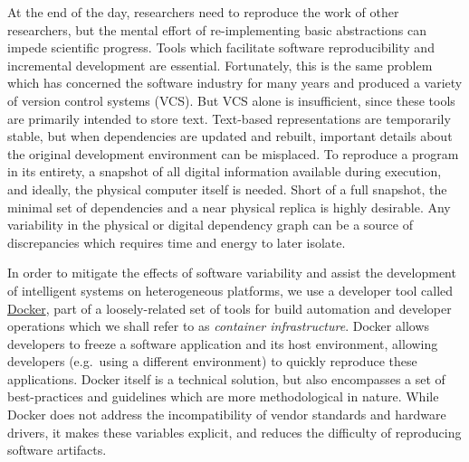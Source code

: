 At the end of the day, researchers need to reproduce the work of other researchers, but the mental effort of re-implementing basic abstractions can impede scientific progress. Tools which facilitate software reproducibility and incremental development are essential. Fortunately, this is the same problem which has concerned the software industry for many years and produced a variety of version control systems (VCS). But VCS alone is insufficient, since these tools are primarily intended to store text. Text-based representations are temporarily stable, but when dependencies are updated and rebuilt, important details about the original development environment can be misplaced. To reproduce a program in its entirety, a snapshot of all digital information available during execution, and ideally, the physical computer itself is needed. Short of a full snapshot, the minimal set of dependencies and a near physical replica is highly desirable. Any variability in the physical or digital dependency graph can be a source of discrepancies which requires time and energy to later isolate.

In order to mitigate the effects of software variability and assist the development of intelligent systems on heterogeneous platforms, we use a developer tool called \href{https://www.docker.com}{Docker}, part of a loosely-related set of tools for build automation and developer operations which we shall refer to as \textit{container infrastructure}. Docker allows developers to freeze a software application and its host environment, allowing developers (e.g.~using a different environment) to quickly reproduce these applications. Docker itself is a technical solution, but also encompasses a set of best-practices and guidelines which are more methodological in nature. While Docker does not address the incompatibility of vendor standards and hardware drivers, it makes these variables explicit, and reduces the difficulty of reproducing software artifacts.

